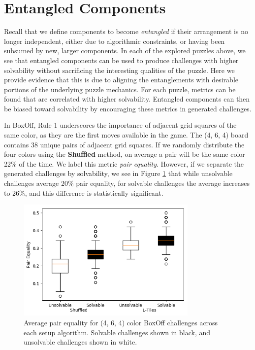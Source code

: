 \documentclass[journal]{IEEEtran}
\begin{document}
%


%

\section{Entangled Components}
\label{entangled}


%

%
%
%
%
%
%
%
%
%
%
%
%

%
%


%
%
%
%
%
%
%
%
%
%
%
%
%

%
\noindent
Recall that we define components to become {\it entangled} if their arrangement is no longer independent, either due to algorithmic constraints, or having been subsumed by new, larger components. In each of the explored puzzles above, we see that entangled components can be used to produce challenges with higher solvability without sacrificing the interesting qualities of the puzzle. Here we provide evidence that this is due to aligning the entanglements with desirable portions of the underlying puzzle mechanics. For each puzzle, metrics can be found that are correlated with higher solvability. Entangled components can then be biased toward solvability by encouraging these metrics in generated challenges.

%

In BoxOff, Rule 1 underscores the importance of adjacent grid squares of the same color, as they are the first moves available in the game. The (4, 6, 4) board contains 38 unique pairs of adjacent grid squares. If we randomly distribute the four colors using the \textbf{Shuffled} method, on average a pair will be the same color 22\% of the time. We label this metric {\it pair equality}. However, if we separate the generated challenges by solvability, we see in Figure \ref{fig:boxoffconnected} that while unsolvable challenges average 20\% pair equality, for solvable challenges the average increases to 26\%, and this difference is statistically significant.

\begin{figure}[t]
\includegraphics[width=8.8cm]{figure18.png}
\caption{Average pair equality for (4, 6, 4) color BoxOff challenges across each setup algorithm. Solvable challenges shown in black, and unsolvable challenges shown in white.}
\label{fig:boxoffconnected}
\end{figure}
\end{document}
